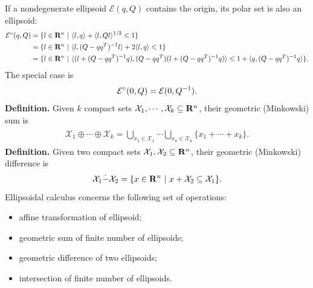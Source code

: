 \documentclass[letterpaper,10pt,english]{sphinxmanual}
\begin{document}
If a nondegenerate ellipsoid \({\mathcal E}(q,Q)\) contains the
origin, its polar set is also an ellipsoid:
\begin{gather}
\begin{split}\begin{aligned}
{\mathcal E}^\circ(q,Q) & = \{l\in{\bf R}^n ~|~ \langle l,q\rangle +
\langle l,Ql\rangle^{1/2}\leqslant1 \}\\
& = \{l\in{\bf R}^n ~|~ \langle l,(Q-qq^T)^{-1}l\rangle +
2\langle l,q\rangle\leqslant1 \}\\
& = \{l\in{\bf R}^n ~|~ \langle(l+(Q-qq^T)^{-1}q),
(Q-qq^T)(l+(Q-qq^T)^{-1}q)\rangle\leqslant1+\langle q,(Q-qq^T)^{-1}q\rangle \}.\end{aligned}\end{split}\notag
\end{gather}
The special case is
\begin{gather}
\begin{split}{\mathcal E}^\circ(0,Q) = {\mathcal E}(0,Q^{-1}).\end{split}\notag
\end{gather}
\textbf{Definition.} Given \(k\) compact sets
\({\mathcal X}_1, \cdots, {\mathcal X}_k\subseteq{\bf R}^n\), their
geometric (Minkowski) sum is
\label{chap_ellcalc:equation-minksum}\begin{gather}
\begin{split}{\mathcal X}_1\oplus\cdots\oplus{\mathcal X}_k=\bigcup_{x_1\in{\mathcal X}_1}\cdots\bigcup_{x_k\in{\mathcal X}_k}
\{x_1 + \cdots + x_k\} .\end{split}\label{chap_ellcalc-minksum}
\end{gather}
\textbf{Definition.} Given two compact sets
\({\mathcal X}_1, {\mathcal X}_2 \subseteq{\bf R}^n\), their
geometric (Minkowski) difference is
\label{chap_ellcalc:equation-minkdiff}\begin{gather}
\begin{split}{\mathcal X}_1\dot{-}{\mathcal X}_2 = \{x\in{\bf R}^n ~|~ x + {\mathcal X}_2 \subseteq {\mathcal X}_1 \}.\end{split}\label{chap_ellcalc-minkdiff}
\end{gather}
Ellipsoidal calculus concerns the following set of operations:
\begin{itemize}
\item {} 
affine transformation of ellipsoid;

\item {} 
geometric sum of finite number of ellipsoids;

\item {} 
geometric difference of two ellipsoids;

\item {} 
intersection of finite number of ellipsoids.

\end{itemize}
\end{document}
